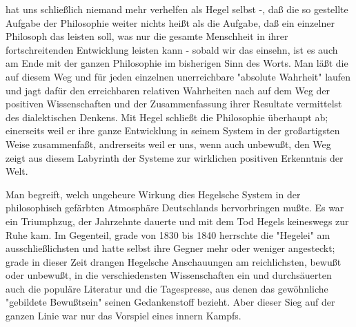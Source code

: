 hat uns schließlich niemand mehr verhelfen als Hegel selbst -, daß die
so gestellte Aufgabe der Philosophie weiter nichts heißt als die
Aufgabe, daß ein einzelner Philosoph das leisten soll, was nur die
gesamte Menschheit in ihrer fortschreitenden Entwicklung leisten kann -
sobald wir das einsehn, ist es auch am Ende mit der ganzen Philosophie
im bisherigen Sinn des Worts. Man läßt die auf diesem Weg und für jeden
einzelnen unerreichbare "absolute Wahrheit" laufen und jagt dafür den
erreichbaren relativen Wahrheiten nach auf dem Weg der positiven
Wissenschaften und der Zusammenfassung ihrer Resultate vermittelst des
dialektischen Denkens. Mit Hegel schließt die Philosophie überhaupt ab;
einerseits weil er ihre ganze Entwicklung in seinem System in der
großartigsten Weise zusammenfaßt, andrerseits weil er uns, wenn auch
unbewußt, den Weg zeigt aus diesem Labyrinth der Systeme zur wirklichen
positiven Erkenntnis der Welt.

Man begreift, welch ungeheure Wirkung dies Hegelsche System in
der philosophisch gefärbten Atmosphäre Deutschlands hervorbringen mußte.
Es war ein Triumphzug, der Jahrzehnte dauerte und mit dem Tod Hegels
keineswegs zur Ruhe kam. Im Gegenteil, grade von 1830 bis 1840 herrschte
die "Hegelei" am ausschließlichsten und hatte selbst ihre Gegner mehr
oder weniger angesteckt; grade in dieser Zeit drangen Hegelsche
Anschauungen am reichlichsten, bewußt oder unbewußt, in die
verschiedensten Wissenschaften ein und durchsäuerten auch die populäre
Literatur und die Tagespresse, aus denen das gewöhnliche "gebildete
Bewußtsein" seinen Gedankenstoff bezieht. Aber dieser Sieg auf der
ganzen Linie war nur das Vorspiel eines innern Kampfs.

